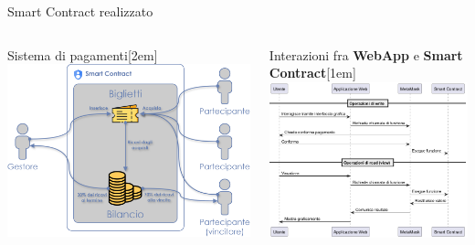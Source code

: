 \documentclass[xcolor=dvipsnames]{beamer}
\def\\{}%
\begin{document}
\begin{frame}{Smart Contract realizzato}
    \begin{columns}
        \begin{column}{0.5\textwidth}
            \centering
            Sistema di pagamenti\\[2em]
            \includegraphics[width=\textwidth]{figures/my_app_diagram.png}
        \end{column}
        \begin{column}{0.5\textwidth}
            \centering
            Interazioni fra \textbf{WebApp} e \textbf{Smart Contract}\\[1em]
            \includegraphics[width=\textwidth]{figures/my_interaction_diagram.png}
        \end{column}
    \end{columns}
\end{frame}
\end{document}
